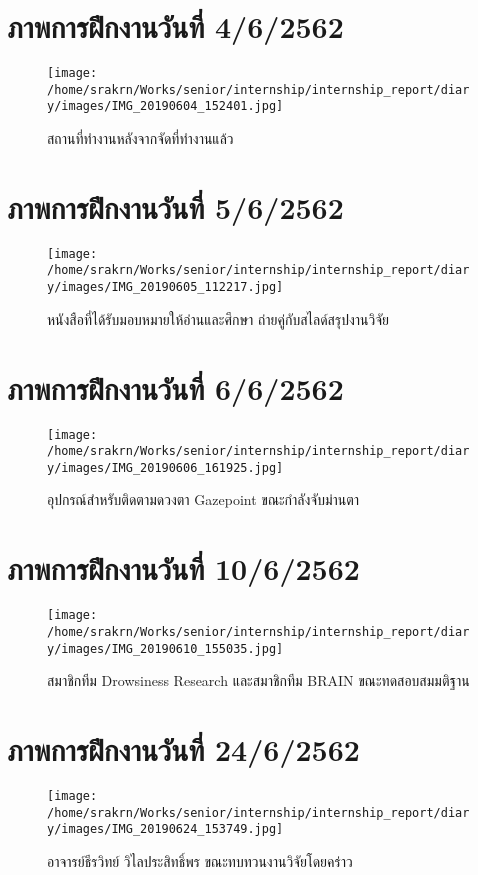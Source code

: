 
\section*{ภาพการฝึกงานวันที่ 4/6/2562}
\begin{figure}[H]
    \centering
    \texttt{[image: /home/srakrn/Works/senior/internship/internship\_report/diary/images/IMG\_20190604\_152401.jpg]}
    \caption{สถานที่ทำงานหลังจากจัดที่ทำงานแล้ว}
\end{figure}

\section*{ภาพการฝึกงานวันที่ 5/6/2562}
\begin{figure}[H]
    \centering
    \texttt{[image: /home/srakrn/Works/senior/internship/internship\_report/diary/images/IMG\_20190605\_112217.jpg]}
    \caption{หนังสือที่ได้รับมอบหมายให้อ่านและศึกษา ถ่ายคู่กับสไลด์สรุปงานวิจัย}
\end{figure}

\section*{ภาพการฝึกงานวันที่ 6/6/2562}
\begin{figure}[H]
    \centering
    \texttt{[image: /home/srakrn/Works/senior/internship/internship\_report/diary/images/IMG\_20190606\_161925.jpg]}
    \caption{อุปกรณ์สำหรับติดตามดวงตา Gazepoint ขณะกำลังจับม่านตา}
\end{figure}

\section*{ภาพการฝึกงานวันที่ 10/6/2562}
\begin{figure}[H]
    \centering
    \texttt{[image: /home/srakrn/Works/senior/internship/internship\_report/diary/images/IMG\_20190610\_155035.jpg]}
    \caption{สมาชิกทีม Drowsiness Research และสมาชิกทีม BRAIN ขณะทดสอบสมมติฐาน}
\end{figure}

\section*{ภาพการฝึกงานวันที่ 24/6/2562}
\begin{figure}[H]
    \centering
    \texttt{[image: /home/srakrn/Works/senior/internship/internship\_report/diary/images/IMG\_20190624\_153749.jpg]}
    \caption{อาจารย์ธีรวิทย์ วิไลประสิทธิ์พร ขณะทบทวนงานวิจัยโดยคร่าว}
\end{figure}
